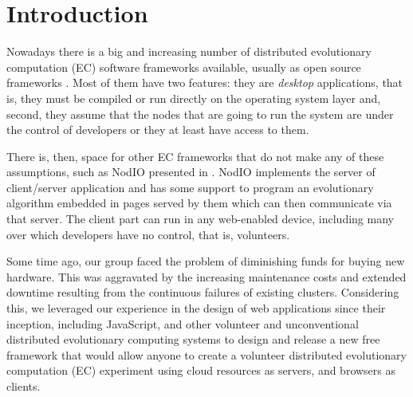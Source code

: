 \documentclass{sig-alternate}
\begin{document}
\section{Introduction}

Nowadays there is a big and increasing number of distributed
evolutionary computation (EC) software frameworks available, usually
as open source frameworks \cite{Parejo12Survey}.  Most of them have
two features: they are {\em desktop} applications, that is, they must
be compiled or run directly on the operating system layer and, second,
they assume that the nodes that are going to run the system are under
the control of developers or they at least have access to them.

There is, then, space for other EC frameworks that do not make any of
these assumptions, such as {\sf NodIO} presented in
\cite{2016arXiv160101607Manom}. {\sf NodIO} implements the server of
client/server application and has some support to program an
evolutionary algorithm embedded in pages served by them which can then
communicate via that server. The client part can run in any
web-enabled device, including many over which developers have no
control, that is, volunteers.

Some time ago, our group faced the problem of diminishing funds for
buying new hardware. This was aggravated by the increasing maintenance costs and
extended downtime resulting from the continuous failures of existing
clusters.
Considering this, we leveraged our experience in the design of web
applications since their inception, including JavaScript, and other
volunteer and
unconventional distributed evolutionary computing systems to 
design and release a new free framework that would allow anyone to
create a volunteer distributed evolutionary computation (EC) experiment using cloud resources as
servers, and browsers as clients.
\end{document}
